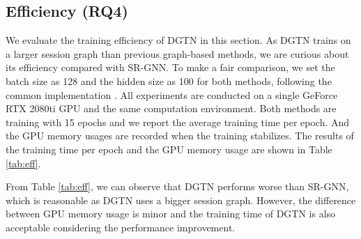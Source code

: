 \documentclass[conference]{IEEEtran}
\begin{document}
\subsection{Efficiency (RQ4)}

\begin{table}[htb]
\caption{Efficiency (training time per epoch and GPU memory usage) comparison between SR-GNN and DGTN.}
\label{tab:eff}
\end{table}

We evaluate the training efficiency of DGTN in this section. As DGTN trains on a larger session graph than previous graph-based methods, we are curious about its efficiency compared with SR-GNN. To make a fair comparison, we set the batch size as 128 and the hidden size as 100 for both methods, following the common implementation \cite{liu2018stamp, wu2019srgnn}. All experiments are conducted on a single GeForce RTX 2080ti GPU and the same computation environment. Both methods are training with 15 epochs and we report the average training time per epoch. And the GPU memory usages are recorded when the training stabilizes. The results of the training time per epoch and the GPU memory usage are shown in Table \ref{tab:eff}.

From Table \ref{tab:eff}, we can observe that DGTN performs worse than SR-GNN, which is reasonable as DGTN uses a bigger session graph. However, the difference between GPU memory usage is minor and the training time of DGTN is also acceptable considering the performance improvement.
\end{document}
